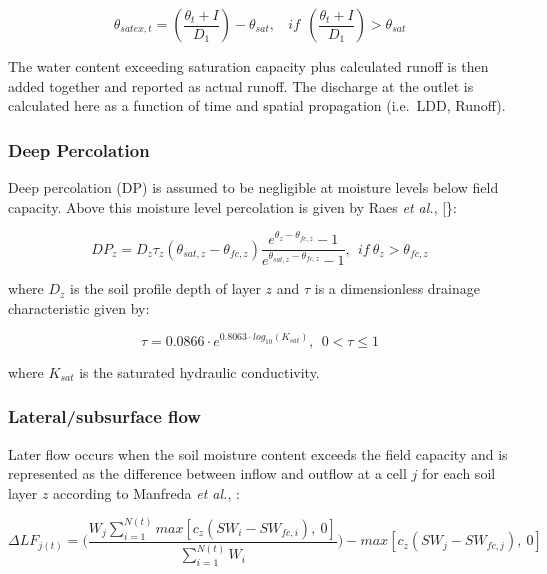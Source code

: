 \documentclass[]{article}
\begin{document}
\begin{equation}
\theta_{satex,t}=(\frac{\theta_t+I}{D_1})-\theta_{sat},  ~~~~if~~(\frac{\theta_t+I}{D_1})>\theta_{sat}
\label{eq:thetat}  
\end{equation}

The water content exceeding saturation capacity plus calculated runoff
is then added together and reported as actual runoff. The discharge at
the outlet is calculated here as a function of time and spatial
propagation (i.e.~LDD, Runoff).

\hypertarget{deep-percolation}{%
\subsubsection{Deep Percolation}\label{deep-percolation}}

Deep percolation (DP) is assumed to be negligible at moisture levels
below field capacity. Above this moisture level percolation is given by
Raes \textit{et al.}, {[}\citet{Raes:2002}\}:

\begin{equation}
DP_z = D_z \tau_z (\theta_{sat, z} - \theta_{fc, z}) \frac{e^{\theta_z-\theta_{fc,z}}-1}{e^{\theta_{sat, z}-\theta_{fc,z}}-1},~~if~ \theta_z > \theta_{fc, z} 
\label{eq:DP}  
\end{equation}

where \(D_z\) is the soil profile depth of layer \(z\) and \(\tau\) is a
dimensionless drainage characteristic given by:

\begin{equation}
\tau = 0.0866 \cdot e^{0.8063 \cdot log_{10}(K_{sat})}, ~~0< \tau \leq 1
\label{eq:tau}  
\end{equation}

where \(K_{sat}\) is the saturated hydraulic conductivity.

\hypertarget{lateralsubsurface-flow}{%
\subsubsection{Lateral/subsurface flow}\label{lateralsubsurface-flow}}

Later flow occurs when the soil moisture content exceeds the field
capacity and is represented as the difference between inflow and outflow
at a cell \(j\) for each soil layer \(z\) according to Manfreda
\textit{et al.}, \citep{Manfreda2005}:

\begin{equation}
\Delta LF_{j(t)} = \Big( \frac{W_{j} \sum^{N(t)}_{i=1}max[c_{z}(SW_{i}-SW_{fc,i}),~0] }{ \sum^{N(t)}_{i=1} W_{i} } \Big) - max[c_z(SW_j-SW_{fc,j}),~0]
\label{eq:LF}  
\end{equation}
\end{document}
